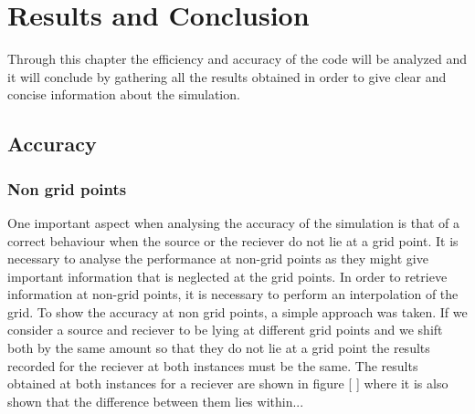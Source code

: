 %
%
%


\chapter{Results and Conclusion}
\label{chapter5}
Through this chapter the efficiency and accuracy of the code will be analyzed and it will conclude by gathering all the results obtained in order to give clear and concise information about the simulation.
\section{Accuracy}
\label{chapter5:sec1}
\subsection{Non grid points}
\label{chapter5:sec1:ss1}
One important aspect when analysing the accuracy of the simulation is that of a correct behaviour when the source or the reciever do not lie at a grid point. It is necessary to analyse the performance at non-grid points as they might give important information that is neglected at the grid points. In order to retrieve information at non-grid points, it is necessary to perform an interpolation of the grid. To show the accuracy at non grid points, a simple approach was taken. If we consider a source and reciever to be lying at different grid points and we shift both by the same amount so that they do not lie at a grid point  the results recorded for the reciever at both instances must be the same. The results obtained at both instances for a reciever are shown in figure [ ] where it is also shown that the difference between them lies within...
\label{chapter5:sec2}
